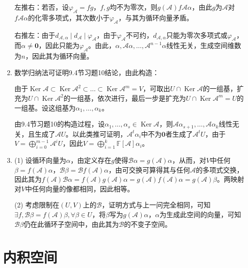 \documentclass[a4paper,UTF8,fontset=windows]{ctexart}
\DeclareMathOperator{\Ker}{Ker}
\begin{document}
\begin{enumerate}
左推右：若否，设$\varphi_\mathcal{A}=fg$，$f,g$均不为零次，则$g(\mathcal{A})f\mathcal{A}\alpha$，由此$g$为$\mathcal{A}$对$f\mathcal{A}\alpha$的化零多项式，其次数小于$\varphi_\mathcal{A}$，与其为循环向量矛盾。

右推左：由于$d_{\mathcal{A},\alpha}\mid d_\mathcal{A}\mid\varphi_\mathcal{A}$，由于$\varphi_\mathcal{A}$不可约，$d_{\mathcal{A},\alpha}$只能为零次多项式或$\varphi_\mathcal{A}$，而$\alpha\ne\mathbf{0}$，因此只能为$\varphi_\mathcal{A}$。由此，$\alpha,\mathcal{A}\alpha,\dots,\mathcal{A}^{n-1}\alpha$线性无关，生成空间维数为$n$，因此其为循环向量。

\item
数学归纳法可证明9.4节习题10结论，由此构造：

由于$\Ker\mathcal{A}\subset\Ker\mathcal{A}^2\subset\dots\subset\Ker\mathcal{A}^m=V$，可取出$U\cap\Ker\mathcal{A}$的一组基，扩充为$U\cap\Ker\mathcal{A}^2$的一组基，依次进行，最后一步是扩充为$U\cap\Ker\mathcal{A}^m=U$的一组基。设这组基为$\alpha_1,\dots,\alpha_k$。

由9.4节习题10的构造过程，设$\alpha_1,\dots,\alpha_s\in\Ker\mathcal{A}$，则$\mathcal{A}\alpha_{s+1},\dots,\mathcal{A}\alpha_k$线性无关，且生成了$\mathcal{A}U$。以此类推可证明，$\mathcal{A}^t\alpha_i$中不为$\mathbf{0}$者生成了$\mathcal{A}^tU$，由于$V=\bigoplus_{i=0}^{m-1}\mathcal{A}^iU$，因此$V=\bigoplus_{i=1}^k\mathbb{F}[\mathcal{A}]\alpha_i$。

\item
(1) 设循环向量为$\alpha$，由定义存在$g$使得$\mathcal{B}\alpha=g(\mathcal{A})\alpha$，从而，对$V$中任何$\beta=f(\mathcal{A})\alpha$，$\mathcal{B}\beta=\mathcal{B}f(\mathcal{A})\alpha$，由可交换可算得其与任何$\mathcal{A}$的多项式交换，因此其为$f(\mathcal{A})\mathcal{B}\alpha=f(\mathcal{A})g(\mathcal{A})\alpha=g(\mathcal{A})f(\mathcal{A})\alpha=g(\mathcal{A})\beta$。两映射对$V$中任何向量的像都相同，因此相等。

(2) 考虑限制在$(U,V)$上的$\mathcal{B}$，证明方式与上一问完全相同，可知$\exists f,\mathcal{B}\beta=f(\mathcal{A})\beta,\forall\beta\in U$，将$\beta$写为$g(\mathcal{A})\alpha$，$\alpha$为生成此空间的向量，可知$\mathcal{B}\beta$仍在此循环子空间中，由此其为$\mathcal{B}$的不变子空间。
\end{enumerate}

\section{内积空间}
\end{document}
